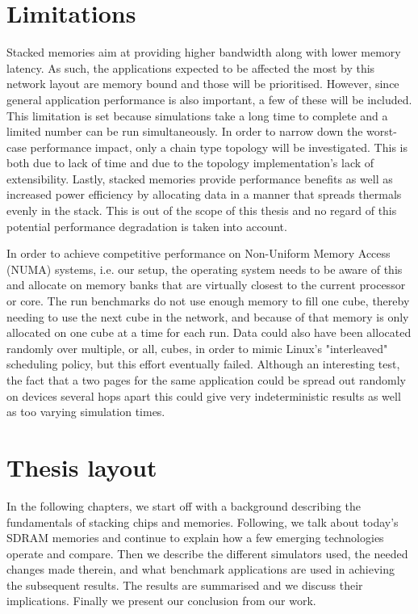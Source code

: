 \section{Limitations}
Stacked memories aim at providing higher bandwidth along with lower memory latency. As such, the applications expected to be affected the most by this network layout are memory bound and those will be prioritised. However, since general application performance is also important, a few of these will be included. This limitation is set because simulations take a long time to complete and a limited number can be run simultaneously. In order to narrow down the worst-case performance impact, only a chain type topology will be investigated. This is both due to lack of time and due to the topology implementation's lack of extensibility. Lastly, stacked memories provide performance benefits as well as increased power efficiency by allocating data in a manner that spreads thermals evenly in the stack. This is out of the scope of this thesis and no regard of this potential performance degradation is taken into account.
\bigskip

In order to achieve competitive performance on Non-Uniform Memory Access (NUMA) systems, i.e. our setup, the operating system needs to be aware of this and allocate on memory banks that are virtually closest to the current processor or core. The run benchmarks do not use enough memory to fill one cube, thereby needing to use the next cube in the network, and because of that memory is only allocated on one cube at a time for each run. Data could also have been allocated randomly over multiple, or all, cubes, in order to mimic Linux's "interleaved" scheduling policy, but this effort eventually failed. Although an interesting test, the fact that a two pages for the same application could be spread out randomly on devices several hops apart this could give very indeterministic results as well as too varying simulation times.
\bigskip

\section{Thesis layout}
In the following chapters, we start off with a background describing the fundamentals of stacking chips and memories. Following, we talk about today's SDRAM memories and continue to explain how a few emerging technologies operate and compare. Then we describe the different simulators used, the needed changes made therein, and what benchmark applications are used in achieving the subsequent results. The results are summarised and we discuss their implications. Finally we present our conclusion from our work.